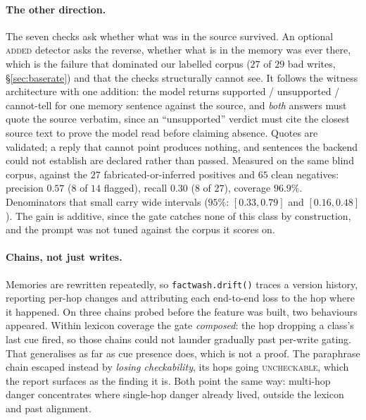 \documentclass[11pt]{article}
\begin{document}
\paragraph{The other direction.} The seven checks ask whether what was in the source
survived. An optional \textsc{added} detector asks the reverse, whether what is in the
memory was ever there, which is the failure that dominated our labelled corpus
($27$ of $29$ bad writes, \S\ref{sec:baserate}) and that the checks structurally cannot
see. It follows the witness architecture with one addition: the model returns
supported / unsupported / cannot-tell for one memory sentence against the source, and
\emph{both} answers must quote the source verbatim, since an ``unsupported'' verdict
must cite the closest source text to prove the model read before claiming absence.
Quotes are validated; a reply that cannot point produces nothing, and sentences the
backend could not establish are declared rather than passed. Measured on the same
blind corpus, against the $27$ fabricated-or-inferred positives and $65$ clean
negatives: precision $0.57$ ($8$ of $14$ flagged), recall $0.30$ ($8$ of $27$), coverage
$96.9\%$. Denominators that small carry wide intervals ($95\%$: $[0.33, 0.79]$ and
$[0.16, 0.48]$). The gain is additive, since the gate catches none of this class by
construction, and the prompt was not tuned against the corpus it scores on.

\paragraph{Chains, not just writes.} Memories are rewritten repeatedly, so
\texttt{factwash.drift()} traces a version history, reporting per-hop changes and
attributing each end-to-end loss to the hop where it happened. On three chains probed
before the feature was built, two behaviours appeared. Within lexicon coverage the gate
\emph{composed}: the hop dropping a class's last cue fired, so those chains could not
launder gradually past per-write gating. That generalises as far as cue presence does,
which is not a proof. The paraphrase chain escaped instead by \emph{losing
checkability}, its hops going \textsc{uncheckable}, which the report surfaces as the
finding it is. Both point the same way: multi-hop danger concentrates where single-hop
danger already lived, outside the lexicon and past alignment.
\end{document}
